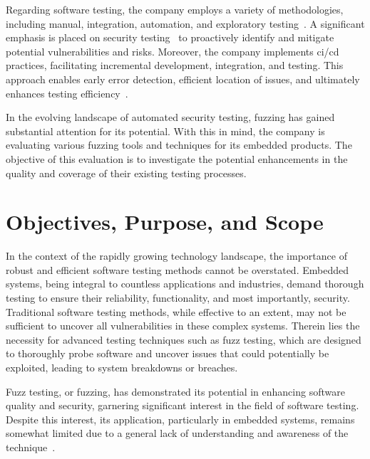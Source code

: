 Regarding software testing, the company employs a variety of methodologies,
including manual, integration, automation, and exploratory testing~\cite{WhatisEx64:online}.
A significant emphasis is placed on security testing~\cite{baker2013analyzing} to proactively
identify and mitigate potential vulnerabilities and risks. Moreover,
the company implements \gls{ci/cd} practices,
facilitating incremental development, integration, and testing. This approach
enables early error detection, efficient location of issues, and
ultimately enhances testing efficiency~\cite{DevOpsin19:online}.

In the evolving landscape of automated security testing, fuzzing has
gained substantial attention for its potential. With this in mind,
the company is evaluating various fuzzing tools and techniques for its
embedded products. The objective of this evaluation is to investigate the
potential enhancements in the quality and coverage of their existing
testing processes.

\section{Objectives, Purpose, and Scope}

In the context of the rapidly growing technology landscape, the importance of
robust and efficient software testing methods cannot be overstated.
Embedded systems, being integral to countless applications and industries,
demand thorough testing to ensure their reliability, functionality, and most
importantly, security. Traditional software testing methods, while effective to
an extent, may not be sufficient to uncover all vulnerabilities in these
complex systems. Therein lies the necessity for advanced testing techniques
such as fuzz testing, which are designed to thoroughly probe software and uncover
issues that could potentially be exploited, leading to system breakdowns or breaches.

Fuzz testing, or fuzzing, has demonstrated its potential in enhancing software
quality and security, garnering significant interest
in the field of software testing. Despite this interest, its application, particularly in
embedded systems, remains somewhat limited due to a general lack of
understanding and awareness of the technique~\cite{liang2018fuzz}.

